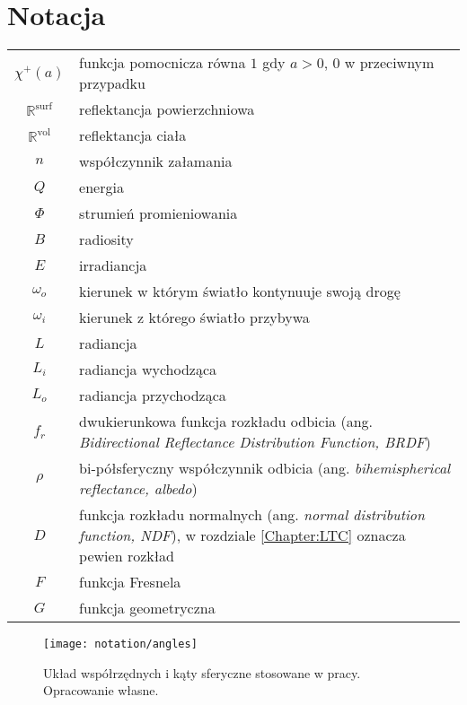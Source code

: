 \documentclass[../main.tex]{subfiles}
\begin{document}
\chapter*{Notacja}

\begin{tabularx}{\textwidth}{ c X }
  $\chi^{+}(a)$ 
  & funkcja pomocnicza równa $1$ gdy $a>0$, 0 w przeciwnym przypadku \\
  
  $\mathbb{R}^{\text{surf}}$
  & reflektancja powierzchniowa \\
  
  $\mathbb{R}^{\text{vol}}$
  & reflektancja ciała \\
  
  $n$
  & współczynnik załamania \\
  
  $Q$
  & energia \\
  
  $\Phi$ 
  & strumień promieniowania \\
  
  $B$
  & radiosity \\
  
  $E$
  & irradiancja \\
  
  $\omega_o$
  & kierunek w którym światło kontynuuje swoją drogę \\
  
  $\omega_i$
  & kierunek z którego światło przybywa \\
  
  $L$
  & radiancja \\
  
  $L_i$
  & radiancja wychodząca \\
  
  $L_o$
  & radiancja przychodząca \\
  
  $f_r$
  & dwukierunkowa funkcja rozkładu odbicia (ang. \textit{Bidirectional Reflectance Distribution Function, BRDF}) \\
  
  $\rho$ 
  & bi-półsferyczny współczynnik odbicia (ang. \textit{bihemispherical reflectance, albedo})\\
  
  $D$
  & funkcja rozkładu normalnych (ang. \textit{normal distribution function, NDF}), w rozdziale \ref{Chapter:LTC} oznacza pewien rozkład \\
  
  $F$
  & funkcja Fresnela \\
  
  $G$ 
  & funkcja geometryczna \\  
\end{tabularx}

\begin{figure}[h]
    \centering
    \texttt{[image: notation/angles]}
    \caption{Układ współrzędnych i kąty sferyczne stosowane w pracy. Opracowanie własne.}
    \label{fig:NotationAngles}
\end{figure}
\end{document}
